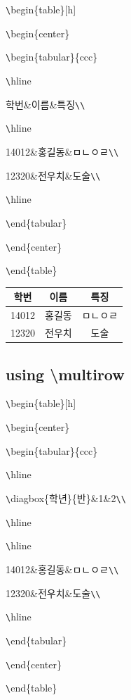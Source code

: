 \documentclass[11pt]{article}
\begin{document}
\longline

\verb+\+begin\{table\}[h]

\verb+\+begin\{center\}

\verb+\+begin\{tabular\}\{\textbar c\textbar c\textbar c\textbar\}

\verb+\+hline

학번\&이름\&특징\verb+\+\verb+\+

\verb+\+hline

14012\&홍길동\&ㅁㄴㅇㄹ\verb+\+\verb+\+

12320\&전우치\&도술\verb+\+\verb+\+

\verb+\+hline

\verb+\+end\{tabular\}

\verb+\+end\{center\}

\verb+\+end\{table\}

\begin{table}[!h]
	\begin{center}
		\begin{tabular}{c|c|c}
			\hline
			학번&이름&특징\\
			\hline
			14012&홍길동&ㅁㄴㅇㄹ\\
			12320&전우치&도술\\
			\hline
		\end{tabular}
	\end{center}
\end{table}

\subsection{using \textbackslash multirow}

\verb+\+begin\{table\}[h]

\verb+\+begin\{center\}

\verb+\+begin\{tabular\}\{\textbar c\textbar c\textbar c\textbar\}

\verb+\+hline

\verb+\+diagbox\{학년\}\{반\}\&1\&2\verb+\+\verb+\+

\verb+\+hline

\verb+\+hline

14012\&홍길동\&ㅁㄴㅇㄹ\verb+\+\verb+\+

12320\&전우치\&도술\verb+\+\verb+\+

\verb+\+hline

\verb+\+end\{tabular\}

\verb+\+end\{center\}

\verb+\+end\{table\}
\end{document}
